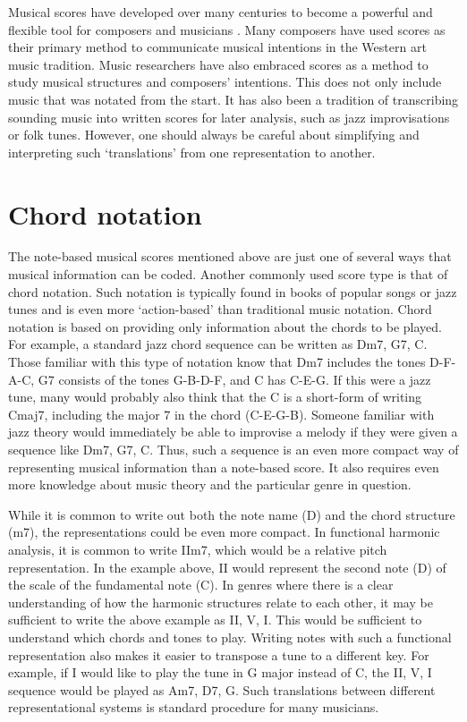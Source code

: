 Musical scores have developed over many centuries to become a powerful and flexible tool for composers and musicians \citep{grier_musical_2021}. Many composers have used scores as their primary method to communicate musical intentions in the Western art music tradition. Music researchers have also embraced scores as a method to study musical structures and composers' intentions.
This does not only include music that was notated from the start. It has also been a tradition of transcribing sounding music into written scores for later analysis, such as jazz improvisations or folk tunes. However, one should always be careful about simplifying and interpreting such `translations' from one representation to another.


\section{Chord notation}

The note-based musical scores mentioned above are just one of several ways that musical information can be coded. Another commonly used score type is that of chord notation. Such notation is typically found in books of popular songs or jazz tunes and is even more `action-based' than traditional music notation. Chord notation is based on providing only information about the chords to be played. For example, a standard jazz chord sequence can be written as Dm7, G7, C. Those familiar with this type of notation know that Dm7 includes the tones D-F-A-C, G7 consists of the tones G-B-D-F, and C has C-E-G. If this were a jazz tune, many would probably also think that the C is a short-form of writing Cmaj7, including the major 7 in the chord (C-E-G-B). Someone familiar with jazz theory would immediately be able to improvise a melody if they were given a sequence like Dm7, G7, C. Thus, such a sequence is an even more compact way of representing musical information than a note-based score. It also requires even more knowledge about music theory and the particular genre in question.

While it is common to write out both the note name (D) and the chord structure (m7), the representations could be even more compact. In functional harmonic analysis, it is common to write IIm7, which would be a relative pitch representation. In the example above, II would represent the second note (D) of the scale of the fundamental note (C). In genres where there is a clear understanding of how the harmonic structures relate to each other, it may be sufficient to write the above example as II, V, I. This would be sufficient to understand which chords and tones to play. Writing notes with such a functional representation also makes it easier to transpose a tune to a different key. For example, if I would like to play the tune in G major instead of C, the II, V, I sequence would be played as Am7, D7, G. Such translations between different representational systems is standard procedure for many musicians.

